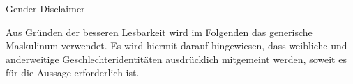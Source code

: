 \pagebreak
\begin{center}
	\large Gender-Disclaimer
\end{center}
\vspace{0.5cm}

\noindent Aus Gründen der besseren Lesbarkeit wird im Folgenden das generische Maskulinum verwendet. Es wird hiermit darauf hingewiesen, dass weibliche und anderweitige Geschlechteridentitäten ausdrücklich mitgemeint werden, soweit es für die Aussage erforderlich ist.

\vspace{3cm}

\pagebreak